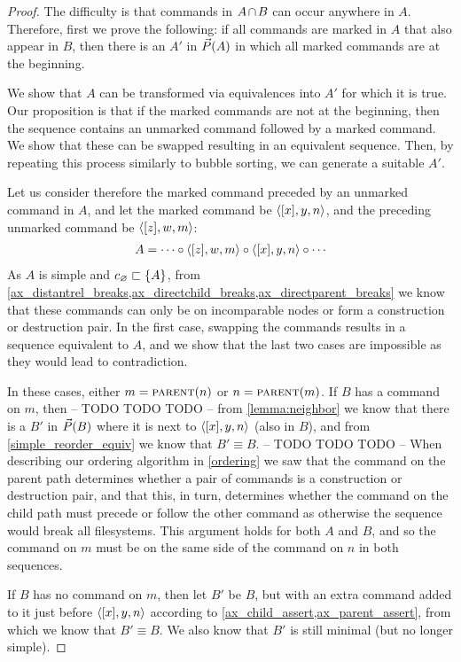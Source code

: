 \begin{proof}
The difficulty is that commands in $\acbnp$ can occur anywhere in $A$.
Therefore, first we prove the following:
if all commands are marked in $A$ that also appear in $B$,
then there is an $A'$ in $\vec{P}({A})$ in which all marked commands are at the beginning.

We show that $A$ can be transformed via equivalences into $A'$ for which it is true.
Our proposition is that if the marked commands are not at the beginning, then
the sequence contains an unmarked command followed by a marked command.
We show that these can be swapped resulting in an equivalent sequence.
Then, by repeating this process similarly to bubble sorting, we can generate 
a suitable $A'$.

Let us consider therefore the marked command preceded by an unmarked command in $A$,
and let the marked command be $\langle{[x],y,n}\rangle$, 
and the preceding unmarked command be $\langle{[z],w,m}\rangle$:
\begin{gather*}
A = \cdots\circ  \langle{[z],w,m}\rangle\circ  \langle{[x],y,n}\rangle\circ  \cdots
\end{gather*}
As $A$ is simple and $c_\varnothing\sqsubset{\{{A}\}}$, from 
\cref{ax_distantrel_breaks,ax_directchild_breaks,ax_directparent_breaks}
we know that these commands can only be on incomparable nodes or form a construction or destruction pair.
In the first case, swapping the commands results in a sequence equivalent to $A$,
and we show that the last two cases are impossible as they would lead to contradiction.

In these cases, either $m=\text{\normalfont\scshape{parent}}(n)$ or $n=\text{\normalfont\scshape{parent}}(m)$.
If $B$ has a command on $m$, then
-- TODO TODO TODO --
from \cref{lemma:neighbor}
we know that there is a $B'$ in $\vec{P}({B})$ where it is next to $\langle{[x],y,n}\rangle$ (also in $B$),
and from \cref{simple_reorder_equiv} we know that $B'\equiv B$.
-- TODO TODO TODO --
When describing our ordering algorithm in \cref{ordering} we saw
that the command on the parent path determines whether a pair of commands
is a construction or destruction pair,
and that this, in turn, determines whether the command on the child path must
precede or follow the other command as otherwise the sequence would break all filesystems.
This argument holds for both $A$ and $B$, and so the command on $m$ must be on
the same side of the command on $n$ in both sequences.

If $B$ has no command on $m$, then let $B'$ be $B$, 
but with an extra command added to it just before $\langle{[x],y,n}\rangle$
according to \cref{ax_child_assert,ax_parent_assert}, 
from which we know that $B'\equiv B$.
We also know that $B'$ is still minimal (but no longer simple).


\end{proof}
